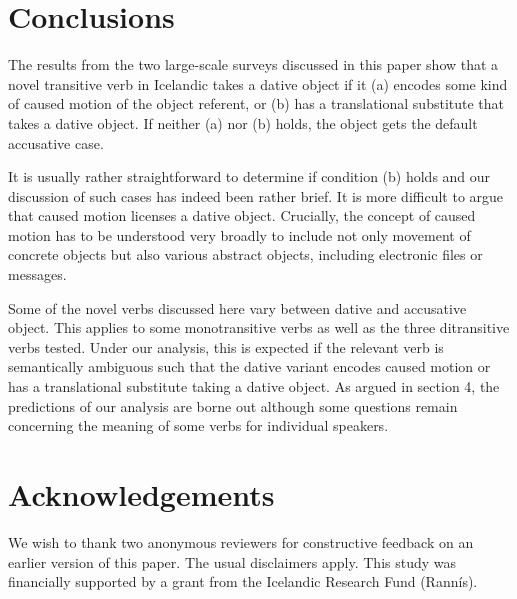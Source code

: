 \documentclass[output=paper,modfonts,nonflat,colorlinks,citecolor=brown]{langsci/langscibook}
\begin{document}
\section{Conclusions}

The results from the two large-scale surveys discussed in this paper show that a novel transitive verb in Icelandic takes a dative object if it (a) encodes some kind of caused motion of the object referent, or (b) has a translational substitute that takes a dative object. If neither (a) nor (b) holds, the object gets the default accusative case. 

It is usually rather straightforward to determine if condition (b) holds and our discussion of such cases has indeed been rather brief. It is more difficult to argue that caused motion licenses a dative object. Crucially, the concept of caused motion has to be understood very broadly to include not only movement of concrete objects but also various abstract objects, including electronic files or messages. 

Some of the novel verbs discussed here vary between dative and accusative object. This applies to some monotransitive verbs as well as the three ditransitive verbs tested. Under our analysis, this is expected if the relevant verb is semantically ambiguous such that the dative variant encodes caused motion or has a translational substitute taking a dative object. As argued in section 4, the predictions of our analysis are borne out although some questions remain concerning the meaning of some verbs for individual speakers. 
\section*{Acknowledgements}

We wish to thank two anonymous reviewers for constructive feedback on an earlier version of this paper. The usual disclaimers apply. This study was financially supported by a grant from the Icelandic Research Fund (Rannís). 
\sloppy\printbibliography[heading=subbibliography,notkeyword=this]
\end{document}
